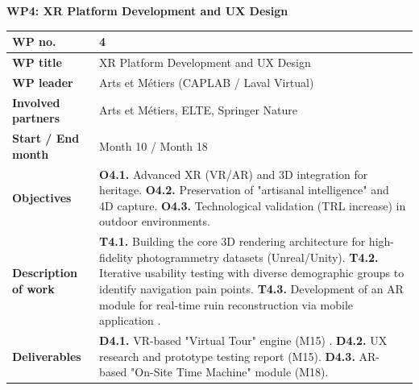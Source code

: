 \textbf{WP4: XR Platform Development and UX Design}
\begin{table}[H]
\centering
\small
\renewcommand{\arraystretch}{1.2}
\begin{tabularx}{\textwidth}{|l|X|}
\hline
\rowcolor{gray!10} \textbf{WP no.} & 4 \\ \hline
\textbf{WP title} & XR Platform Development and UX Design \\ \hline
\textbf{WP leader} & Arts et Métiers (CAPLAB / Laval Virtual) \\ \hline
\textbf{Involved partners} & Arts et Métiers, ELTE, Springer Nature \\ \hline
\textbf{Start / End month} & Month 10 / Month 18 \\ \hline
\textbf{Objectives} & \textbf{O4.1.} Advanced XR (VR/AR) and 3D integration for heritage. \newline \textbf{O4.2.} Preservation of "artisanal intelligence" and 4D capture. \newline \textbf{O4.3.} Technological validation (TRL increase) in outdoor environments. \\ \hline
\textbf{Description of work} & \textbf{T4.1.} Building the core 3D rendering architecture for high-fidelity photogrammetry datasets (Unreal/Unity). \newline \textbf{T4.2.} Iterative usability testing with diverse demographic groups to identify navigation pain points. \newline \textbf{T4.3.} Development of an AR module for real-time ruin reconstruction via mobile application . \\ \hline
\textbf{Deliverables} & \textbf{D4.1.} VR-based "Virtual Tour" engine (M15) . \newline \textbf{D4.2.} UX research and prototype testing report (M15). \newline \textbf{D4.3.} AR-based "On-Site Time Machine" module (M18). \\ \hline
\end{tabularx}
\end{table}